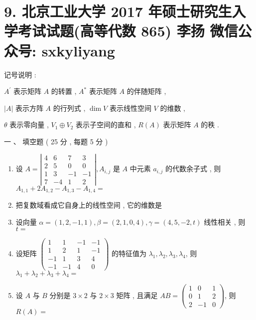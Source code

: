 \documentclass[10pt]{article}
\begin{document}
{\section{9. 北京工业大学 2017 年硕士研究生入学考试试题(高等代数 865) 
 李扬 
 微信公众号: sxkyliyang}
 记号说明 :

$A^{\prime}$  表示矩阵  $A$  的转置 , $A^{*}$  表示矩阵  $A$  的伴随矩阵 ,

$|A|$  表示方阵  $A$  的行列式 , $\operatorname{dim} V$  表示线性空间  $V$  的维数 ,

$\theta$  表示零向量 , $V_{1} \oplus V_{2}$  表示子空间的直和 , $R(A)$  表示矩阵  $A$  的秩 .

 一 、 填空题  ( 25  分 , 每题 5 分 )

\begin{enumerate}
  \item  设  $A=\left|\begin{array}{cccc}4 & 6 & 7 & 3 \\ 2 & 5 & 0 & 0 \\ 1 & 3 & -1 & -1 \\ 7 & -4 & 1 & 2\end{array}\right|, A_{i, j}$  是  $A$  中元素  $a_{i, j}$  的代数余子式 ,  则  $A_{1,1}+2 A_{1,2}-A_{1,3}-A_{1,4}=$

  \item  把复数域看成它自身上的线性空间 ,  它的维数是 

  \item  设向量  $\alpha=(1,2,-1,1), \beta=(2,1,0,4), \gamma=(4,5,-2, t)$  线性相关 ,  则  $t=$

  \item  设矩阵  $\left(\begin{array}{cccc}1 & 1 & -1 & -1 \\ 1 & 2 & 1 & -1 \\ -1 & 1 & 3 & 4 \\ -1 & -1 & 4 & 0\end{array}\right)$  的特征值为  $\lambda_{1}, \lambda_{2}, \lambda_{3}, \lambda_{4}$,  则  $\lambda_{1}+\lambda_{2}+\lambda_{3}+\lambda_{4}=$

  \item  设  $A$  与  $B$  分别是  $3 \times 2$  与  $2 \times 3$  矩阵 ,  且满足  $A B=\left(\begin{array}{ccc}1 & 0 & 1 \\ 0 & 1 & 2 \\ 2 & -1 & 0\end{array}\right)$,  则  $R(A)=$


\end{enumerate}}
\end{document}
